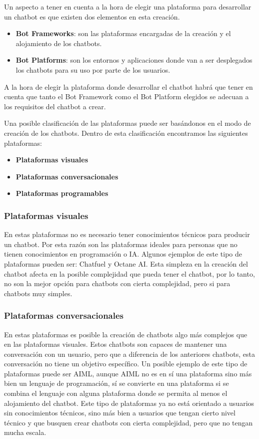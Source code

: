 Un aspecto a tener en cuenta a la hora de elegir una plataforma para desarrollar un chatbot es que existen dos elementos en esta creación.

\begin{itemize}
\item \textbf{Bot Frameworks}: son las plataformas encargadas de la creación y el alojamiento de los chatbots.
\item \textbf{Bot Platforms}: son los entornos y aplicaciones donde van a ser desplegados los chatbots para su uso por parte de los usuarios.
\end{itemize}

A la hora de elegir la plataforma donde desarrollar el chatbot habrá que tener en cuenta que tanto el Bot Framework como el Bot Platform elegidos se adecuan a los requisitos del chatbot a crear.

Una posible clasificación de las plataformas puede ser basándonos en el modo de creación de los chatbots. Dentro de esta clasificación encontramos las siguientes plataformas:

\begin{itemize}
\item \textbf{Plataformas visuales}
\item \textbf{Plataformas conversacionales}
\item \textbf{Plataformas programables}
\end{itemize}

\subsubsection*{Plataformas visuales}

En estas plataformas no es necesario tener conocimientos técnicos para producir un chatbot. Por esta razón son las plataformas ideales para personas que no tienen conocimientos en programación o \gls{IA}. Algunos ejemplos de este tipo de plataformas pueden ser: Chatfuel y Octane AI. Esta simpleza en la creación del chatbot afecta en la posible complejidad que pueda tener el chatbot, por lo tanto, no son la mejor opción para chatbots con cierta complejidad, pero si para chatbots muy simples.

\subsubsection*{Plataformas conversacionales}

En estas plataformas es posible la creación de chatbots algo más complejos que en las plataformas visuales. Estos chatbots son capaces de mantener una conversación con un usuario, pero que a diferencia de los anteriores chatbots, esta conversación no tiene un objetivo específico. Un posible ejemplo de este tipo de plataformas puede ser AIML, aunque AIML no es en sí una plataforma sino más bien un lenguaje de programación, sí se convierte en una plataforma si se combina el lenguaje con alguna plataforma donde se permita al menos el alojamiento del chatbot. Este tipo de plataformas ya no está orientado a usuarios sin conocimientos técnicos, sino más bien a usuarios que tengan cierto nivel técnico y que busquen crear chatbots con cierta complejidad, pero que no tengan mucha escala.

